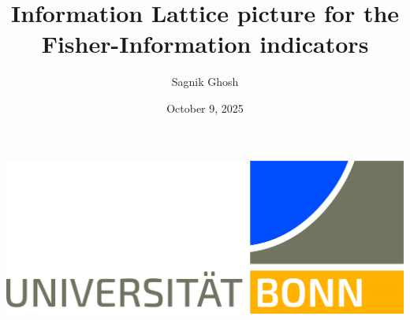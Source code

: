 \documentclass{amsproc}
\title{Information Lattice picture for the Fisher-Information indicators}                        %
\author{Sagnik Ghosh}
\date{October 9, 2025}            %
\begin{document}
\newtheorem{defn}[]{Definition}
\newtheorem{obs}[]{Observation}
\newtheorem{lem}[]{Lemma}
\newtheorem{thm}[]{Theorem}
\newtheorem{corr}[]{Corollary}
\newtheorem{conj}[]{Conjecture}
\newtheorem{prop}[]{Property}
\newtheorem{appr}[]{Approximation}
\newtheorem{claim}[]{Claim}
\newtheorem{notes}[]{Note}



\includegraphics[scale=0.03]{./.src/header/UNI_Bonn_Logo_Standard_RZ_Office.jpg}

\vspace{6mm}

\maketitle







\printbibliography



\end{document}
